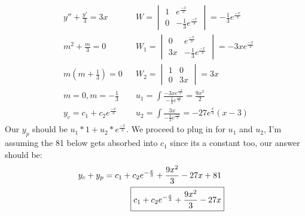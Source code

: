 \documentclass{article}
\begin{document}
\begin{align*}
    & y'' + \frac{y'}{3} = 3x  && W =  
    \begin{vmatrix}
        1 & e^{\frac{-x}{3}} \\
        0 & -\frac{1}{3}e^{\frac{-x}{3}} 
    \end{vmatrix} = -\frac{1}{3}e^{\frac{-x}{3}} 
    \\
    & m^2 + \frac{m}{3} = 0 && W_1 =
    \begin{vmatrix}
        0 & e^{\frac{-x}{3}} \\
        3x & -\frac{1}{3}e^{\frac{-x}{3}} 
    \end{vmatrix} = -3xe^{\frac{-x}{3}}  
    \\
    & m(m + \frac{1}{3}) = 0 && W_2 =
    \begin{vmatrix}
        1 & 0 \\
        0 & 3x 
    \end{vmatrix} = 3x 
    \\
    & m = 0, m = -\frac{1}{3} && u_1 = \int \frac{-3xe^{\frac{-x}{3}}}{-\frac{1}{3}e^{\frac{-x}{3}}} = \frac{9x^2}{2} \\
    & y_c = c_1 + c_2e^{\frac{-x}{3}} && u_2 = \int \frac{3x}{-\frac{1}{3} e^{\frac{-x}{3}}} = -27e^{\frac{x}{3}}(x-3)
\end{align*}
Our $y_p $ should be $u_1*1 + u_2 * e^{\frac{-x}{3}}$. We proceed to plug in for $u_1$ and $u_2$, 
I'm assuming the 81 below gets absorbed into $c_1$ since its a constant too, our answer should be: 
\begin{align*}
    y_c + y_p = c_1 + c_2e^{-\frac{x}{3}} + \frac{9x^2}{3} - 27x + 81 \\
    \Aboxed{c_1 + c_2e^{-\frac{x}{3}} + \frac{9x^2}{3} - 27x}
\end{align*}
\end{document}
